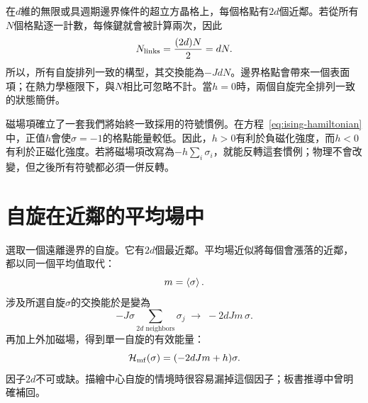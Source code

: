 \begin{classroomqa}
\end{classroomqa}

\begin{classroomqa}
\end{classroomqa}

在\(d\)維的無限或具週期邊界條件的超立方晶格上，每個格點有\(2d\)個近鄰。若從所有\(N\)個格點逐一計數，每條鍵就會被計算兩次，因此
\begin{equation}
N_{\rm links}=\frac{(2d)N}{2}=dN.
\label{eq:number-links}
\end{equation}
所以，所有自旋排列一致的構型，其交換能為\(-JdN\)。邊界格點會帶來一個表面項；在熱力學極限下，與\(N\)相比可忽略不計。當\(h=0\)時，兩個自旋完全排列一致的狀態簡併。

磁場項確立了一套我們將始終一致採用的符號慣例。在方程~\eqref{eq:ising-hamiltonian}中，正值\(h\)會使\(\sigma=-1\)的格點能量較低。因此，\(h>0\)有利於負磁化強度，而\(h<0\)有利於正磁化強度。若將磁場項改寫為\(-h\sum_i\sigma_i\)，就能反轉這套慣例；物理不會改變，但之後所有符號都必須一併反轉。

\begin{classroomqa}
\end{classroomqa}

\section{自旋在近鄰的平均場中}

選取一個遠離邊界的自旋。它有\(2d\)個最近鄰。平均場近似將每個會漲落的近鄰，都以同一個平均值取代：
\begin{equation}
m=\left\langle\sigma\right\rangle.
\end{equation}
涉及所選自旋\(\sigma\)的交換能於是變為
\begin{equation}
-J\sigma\sum_{\text{\(2d\) neighbors}}\sigma_j
\;\longrightarrow\;-2dJm\,\sigma.
\end{equation}
再加上外加磁場，得到單一自旋的有效能量：
\begin{equation}
\mathcal H_{\rm mf}(\sigma)=(-2dJm+h)\sigma.
\label{eq:mean-field-one-spin}
\end{equation}
因子\(2d\)不可或缺。描繪中心自旋的情境時很容易漏掉這個因子；板書推導中曾明確補回。


